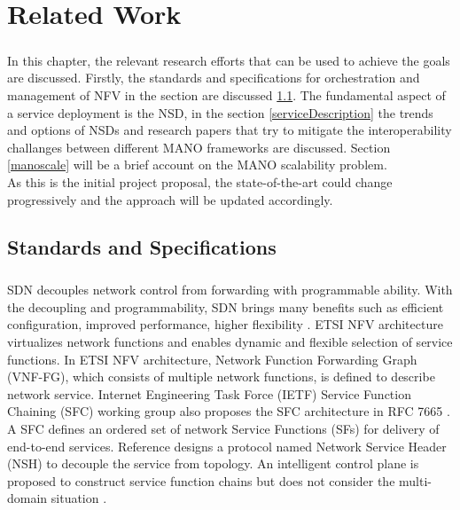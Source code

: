 \chapter{Related Work}
\label{ch:Related Work}

\paragraph{}
In this chapter, the relevant research efforts that can be used to achieve the goals are discussed. Firstly, the standards and specifications for orchestration and management of NFV in the section are discussed \ref{standSpecs}. The fundamental aspect of a service deployment is the NSD, in the section \ref{serviceDescription} the trends and options of NSDs and research papers that try to mitigate the interoperability challanges between different MANO frameworks are discussed. Section \ref{manoscale} will be a brief account on the MANO scalability problem.\\

As this is the initial project proposal, the state-of-the-art could change progressively and the approach will be updated accordingly.


\section{Standards and Specifications}
\label{standSpecs}
\paragraph{}
SDN decouples network control from forwarding with programmable ability. With the decoupling and programmability, SDN brings many benefits such as efficient configuration, improved performance, higher flexibility \cite{xia2015survey}. ETSI NFV \cite{nfv2network} architecture virtualizes network functions and enables dynamic and flexible selection of service functions. In ETSI NFV architecture, Network Function Forwarding Graph (VNF-FG), which consists of multiple network functions, is defined to describe network service. Internet Engineering Task Force (IETF) Service Function Chaining (SFC) working group also proposes the SFC architecture in RFC 7665 \cite{halpern2015service}. A SFC defines an ordered set of network Service Functions (SFs) for delivery of end-to-end services. Reference \cite{quinn2016network} designs a protocol named Network Service Header (NSH) to decouple the service from topology. An intelligent control plane is proposed to construct service function chains but does not consider the multi-domain situation \cite{boucadair2016service}.\\

